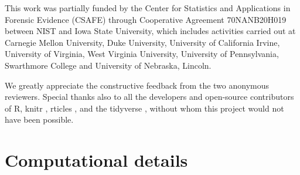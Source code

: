 \documentclass[11pt,]{isuthesis}
\begin{document}
This work was partially funded by the Center for Statistics and Applications in Forensic Evidence (CSAFE) through Cooperative Agreement 70NANB20H019 between NIST and Iowa State University, which includes activities carried out at Carnegie Mellon University, Duke University, University of California Irvine, University of Virginia, West Virginia University, University of Pennsylvania, Swarthmore College and University of Nebraska, Lincoln.

We greatly appreciate the constructive feedback from the two anonymous reviewers.
Special thanks also to all the developers and open-source contributors of R, knitr \citep{knitr1, knitr2}, rticles \citep{rticles}, and the tidyverse \citep{tidyverse}, without whom this project would not have been possible.

\hypertarget{computational-details}{%
\section{Computational details}\label{computational-details}}
\end{document}
